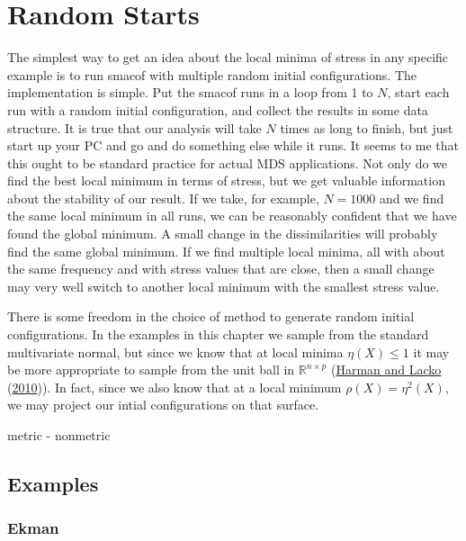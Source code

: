 \documentclass[
  12pt,
]{book}
\theoremstyle{definition}
\theoremstyle{definition}
\theoremstyle{definition}
\theoremstyle{definition}
\theoremstyle{remark}
\begin{document}
\hypertarget{random-starts}{%
\section{Random Starts}\label{random-starts}}

The simplest way to get an idea about the local minima of stress in any specific example is to run smacof with multiple random initial configurations. The implementation is simple. Put the smacof runs in a loop from 1 to \(N\),
start each run with a random initial configuration, and collect the results in some data structure. It is true that our analysis will take \(N\) times as long to finish, but just start up your PC and go and do something else while it runs. It seems to me that this ought to be standard practice for actual MDS applications. Not only do we find the best local minimum in terms of stress, but we get valuable information about the stability of our result.
If we take, for example, \(N=1000\) and we find the same local minimum in all runs, we can be reasonably confident
that we have found the global minimum. A small change in the dissimilarities will probably find the same global minimum. If we find multiple local minima, all with about the same frequency and with stress values that are close, then a small change may very well switch to another local minimum with the smallest stress value.

There is some freedom in the choice of method to generate random initial configurations. In the examples in this chapter we sample from the standard multivariate normal, but since we know that at local minima \(\eta(X)\leq 1\)
it may be more appropriate to sample from the unit ball in \(\mathbb{R}^{n\times p}\) (\protect\hyperlink{ref-harman_lacko_10}{Harman and Lacko} (\protect\hyperlink{ref-harman_lacko_10}{2010})). In fact, since we also know that at a local minimum \(\rho(X)=\eta^2(X)\), we may project our intial configurations on that surface.

metric - nonmetric

\hypertarget{examples-2}{%
\subsection{Examples}\label{examples-2}}

\hypertarget{ekman}{%
\subsubsection{Ekman}\label{ekman}}
\end{document}
